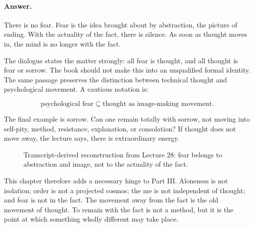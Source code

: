 \documentclass[11pt,oneside]{book}
\begin{document}
\paragraph{Answer.}
There is no fear. Fear is the idea brought about by abstraction, the picture of ending. With the actuality of the fact, there is silence. As soon as thought moves in, the mind is no longer with the fact.

The dialogue states the matter strongly: all fear is thought, and all thought is fear or sorrow. The book should not make this into an unqualified formal identity. The same passage preserves the distinction between technical thought and psychological movement. A cautious notation is:

\begin{equation}
\text{psychological fear}
\subseteq
\text{thought as image-making movement}.
\end{equation}

The final example is sorrow. Can one remain totally with sorrow, not moving into self-pity, method, resistance, explanation, or consolation? If thought does not move away, the lecture says, there is extraordinary energy.

\begin{figure}
\centering
{}
\caption{Transcript-derived reconstruction from Lecture 28: fear belongs to abstraction and image, not to the actuality of the fact.}
\end{figure}

This chapter therefore adds a necessary hinge to Part III. Aloneness is not isolation; order is not a projected cosmos; the me is not independent of thought; and fear is not in the fact. The movement away from the fact is the old movement of thought. To remain with the fact is not a method, but it is the point at which something wholly different may take place.
\end{document}
